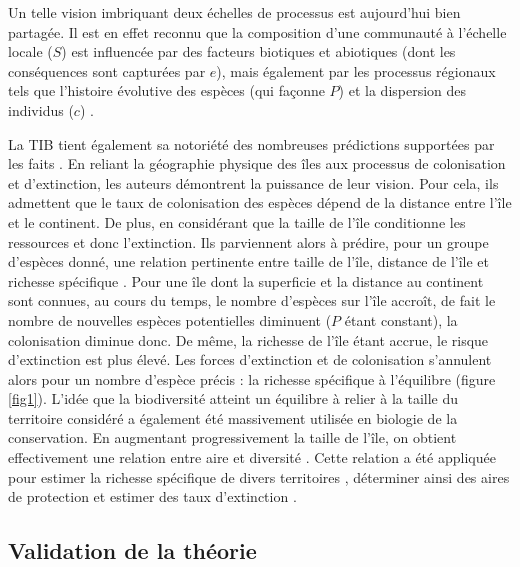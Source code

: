 Un telle vision imbriquant deux échelles de processus est aujourd'hui
bien partagée. Il est en effet reconnu que la composition d'une
communauté à l'échelle locale (\(S\)) est influencée par des facteurs
biotiques et abiotiques (dont les conséquences sont capturées par
\(e\)), mais également par les processus régionaux tels que l'histoire
évolutive des espèces (qui façonne \(P\)) et la dispersion des individus
(\(c\)) \cite{Ricklefs1987,Leibold2004}.

La TIB tient également sa notoriété des nombreuses prédictions
supportées par les faits \cite{MacArthur1967}. En reliant la géographie
physique des îles aux processus de colonisation et d'extinction, les
auteurs démontrent la puissance de leur vision. Pour cela, ils admettent
que le taux de colonisation des espèces dépend de la distance entre
l'île et le continent. De plus, en considérant que la taille de l'île
conditionne les ressources et donc l'extinction. Ils parviennent alors à
prédire, pour un groupe d'espèces donné, une relation pertinente entre
taille de l'île, distance de l'île et richesse spécifique
\cite{MacArthur1967}. Pour une île dont la superficie et la distance au
continent sont connues, au cours du temps, le nombre d'espèces sur l'île
accroît, de fait le nombre de nouvelles espèces potentielles diminuent
(\(P\) étant constant), la colonisation diminue donc. De même, la
richesse de l'île étant accrue, le risque d'extinction est plus élevé.
Les forces d'extinction et de colonisation s'annulent alors pour un
nombre d'espèce précis : la richesse spécifique à l'équilibre (figure
\ref{fig1}). L'idée que la biodiversité atteint un équilibre à relier à
la taille du territoire considéré a également été massivement utilisée
en biologie de la conservation. En augmentant progressivement la taille
de l'île, on obtient effectivement une relation entre aire et diversité
\cite{MacArthur1967, Lomolino2000a}. Cette relation a été appliquée pour
estimer la richesse spécifique de divers territoires \cite{May1988},
déterminer ainsi des aires de protection \cite{Neigel2003,Desmet2004} et
estimer des taux d'extinction \cite{He2011}.

\subsection*{Validation de la
théorie}\label{validation-de-la-thuxe9orie}

